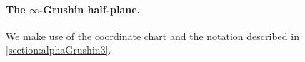 \documentclass[11pt,twoside,a4paper]{article}
\makeatletter
\DeclarePairedDelimiter\abs{\lvert}{\rvert}%
\let\oldabs\abs
\def\abs{\@ifstar{\oldabs}{\oldabs*}}
\newcommand{\red}{\color{red}}
\newcommand*\diff{\mathop{}\!\mathrm{d}}
\newcommand{\vol}{\mathrm{dvol}}
\newcommand{\Ric}{\mathrm{Ric}}
\newcommand{\m}{\mathfrak m} %
\newcommand{\G}{\mathbb{G}}
\theoremstyle{theorem}
\newtheorem{prop}[theorem]{Proposition}
\theoremstyle{definition}
\theoremstyle{remark}
\theoremstyle{proof}
\makeatother
\begin{document}

\paragraph{The $\infty$-Grushin half-plane.}




We make use of the coordinate chart and the notation described in \cref{section:alphaGrushin3}.

\end{document}
